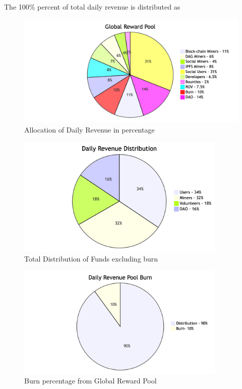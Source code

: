 \documentclass[10pt]{article}
\begin{document}
The 100\% percent of total daily revenue is distributed as \\
\begin{figure}[H]
\begin{center}
\includegraphics[width=14cm]{global-reward}
\caption{Allocation of Daily Revenue in percentage}
\end{center}
\end{figure}

\begin{figure}[H]
\begin{center}
\includegraphics[width=10cm]{revenue-distribution}
\caption{Total Distribution of Funds excluding burn}
\end{center}
\end{figure}

\begin{figure}[H]
\begin{center}
\includegraphics[width=10cm]{burn-chart}
\caption{Burn percentage from Global Reward Pool}
\end{center}
\end{figure}
\end{document}
